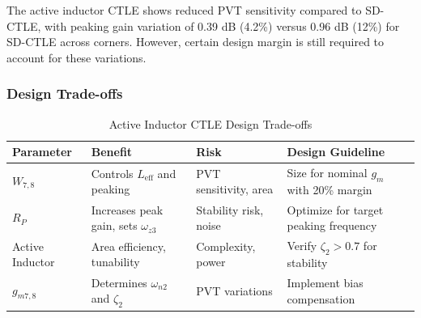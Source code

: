 The active inductor CTLE shows reduced PVT sensitivity compared to SD-CTLE, with peaking gain variation of 0.39 dB (4.2\%) versus 0.96 dB (12\%) for SD-CTLE across corners. However, certain design margin is still required to account for these variations.

\subsubsection*{Design Trade-offs}

\begin{table}[H]
\centering
\caption{Active Inductor CTLE Design Trade-offs}
\label{tab:active_ind_tradeoffs}
\begin{tabular}{ >{\raggedright\arraybackslash}p{} 
                 >{\raggedright\arraybackslash}p{} 
                 >{\raggedright\arraybackslash}p{} 
                 >{\raggedright\arraybackslash}p{} }
\toprule
\textbf{Parameter} & \textbf{Benefit} & \textbf{Risk} & \textbf{Design Guideline} \\
\midrule
$W_{7,8}$ & Controls $L_{\text{eff}}$ and peaking & PVT sensitivity, area & Size for nominal $g_m$ with 20\% margin \\
\midrule
$R_P$ & Increases peak gain, sets $\omega_{z3}$ & Stability risk, noise & Optimize for target peaking frequency \\
\midrule
Active Inductor & Area efficiency, tunability & Complexity, power & Verify $\zeta_2 > 0.7$ for stability \\
\midrule
$g_{m7,8}$ & Determines $\omega_{n2}$ and $\zeta_2$ & PVT variations & Implement bias compensation \\
\bottomrule
\end{tabular}
\end{table}